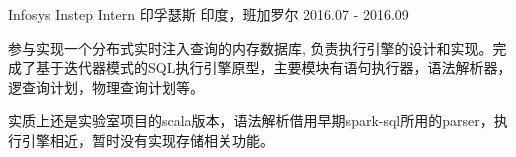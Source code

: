 \begin{cventries}
  \cventry
    {Infosys Instep Intern}
    {印孚瑟斯}
    {印度，班加罗尔}
    {2016.07 - 2016.09}
    {
      \begin{cvitems}
        \item {参与实现一个分布式实时注入查询的内存数据库, 负责执行引擎的设计和实现。完成了基于迭代器模式的SQL执行引擎原型，主要模块有语句执行器，语法解析器，逻查询计划，物理查询计划等。}
	\item {实质上还是实验室项目的scala版本，语法解析借用早期spark-sql所用的parser，执行引擎相近，暂时没有实现存储相关功能。\\[8pt]}
      \end{cvitems}
    }
\end{cventries}


